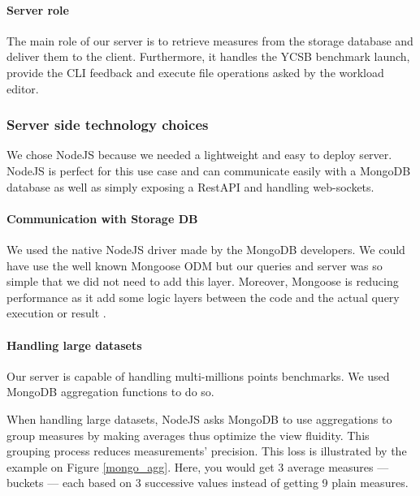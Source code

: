 \documentclass[a4paper,11pt]{report}
\begin{document}
\paragraph{Server role}

The main role of our server is to retrieve measures from the storage database and deliver them to the client. Furthermore, it handles the YCSB benchmark launch, provide the CLI feedback and execute file operations asked by the workload editor. 

\subsubsection{Server side technology choices}

We chose NodeJS because we needed a lightweight and easy to deploy server. NodeJS is perfect for this use case and can communicate easily with a MongoDB database as well as simply exposing a RestAPI and handling web-sockets.

\paragraph{Communication with Storage DB}\label{server:mongo}

We used the native NodeJS driver made by the MongoDB developers. We could have use the well known Mongoose ODM but our queries and server was so simple that we did not need to add this layer. Moreover, Mongoose is reducing performance as it add some logic layers between the code and the actual query execution or result \cite{mongo}.

\paragraph{Handling large datasets}

Our server is capable of handling multi-millions points benchmarks. We used MongoDB aggregation functions to do so.

When handling large datasets, NodeJS asks MongoDB to use aggregations to group measures by making averages thus optimize the view fluidity. This grouping process reduces measurements' precision. This loss is illustrated by the example on Figure \ref{mongo_agg}. Here, you would get 3 average measures --- buckets --- each based on 3 successive values instead of getting 9 plain measures.
\end{document}
